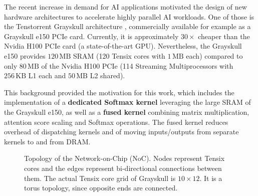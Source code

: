 \documentclass[conference]{IEEEtran}
\begin{document}
The recent increase in demand for AI applications motivated the design of new hardware architectures to accelerate highly parallel AI workloads. One of those is the Tenstorrent Grayskull architecture \cite{vasiljevic2021, tenstorrent-cards, grayskull-architecture, grayskull-noc}, commercially available for example as a Grayskull e150 PCIe card. Currently, it is approximately \(30\times\) cheaper than the Nvidia H100 PCIe card \cite{nvidia2022} (a state-of-the-art GPU). Nevertheless, the Grayskull e150 provides \(120\,\text{MB}\) SRAM (120 Tensix cores with \(1\,\text{MB}\) each) compared to only \(80\,\text{MB}\) of the Nvidia H100 PCIe (114 Streaming Multiprocessors with \(256\,\text{KB}\) L1 each and \(50\,\text{MB}\) L2 shared). 

This background provided the motivation for this work, which includes the implementation of a \textbf{dedicated Softmax kernel} leveraging the large SRAM of the Grayskull e150, as well as a \textbf{fused kernel} combining matrix multiplication, attention score scaling and Softmax operations. The fused kernel reduces overhead of dispatching kernels and of moving inputs/outputs from separate kernels to and from DRAM.

\begin{figure}[h]
\centering
{}
\caption{Topology of the Network-on-Chip (NoC). Nodes represent Tensix cores and the edges represent bi-directional connections between them. The actual Tensix core grid of Grayskull is \(10 \times 12\). It is a torus topology, since opposite ends are connected.}
\label{fig:noc_topology}
\end{figure}
\end{document}
